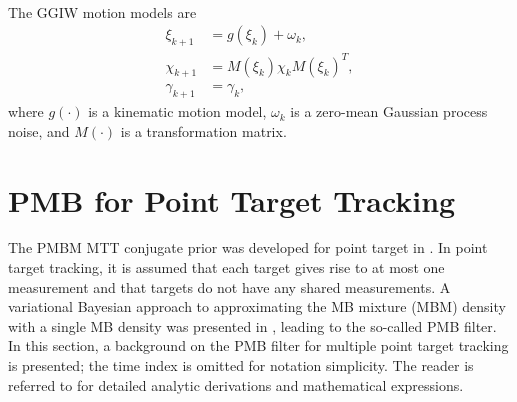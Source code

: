 ~\\
The GGIW motion models are
\begin{subequations}
\begin{align}
\xi_{k+1} &= g(\xi_k) + \omega_k,\\
\chi_{k+1} &= M(\xi_k)\chi_kM(\xi_k)^T,\\
\gamma_{k+1} &= \gamma_{k},
\end{align}
\end{subequations}
where $g(\cdot)$ is a kinematic motion model, $\omega_k$ is a zero-mean Gaussian process noise, and $M(\cdot)$ is a transformation matrix. 




\section{PMB for Point Target Tracking}
The PMBM MTT conjugate prior was developed for point target in \cite{pmbmpoint,pmbmpoint2}. In point target tracking, it is assumed that each target gives rise to at most one measurement and that targets do not have any shared measurements. A variational Bayesian approach to approximating the MB mixture (MBM) density with a single MB density was presented in \cite{variational}, leading to the so-called PMB filter. In this section, a background on the PMB filter for multiple point target tracking is presented; the time index is omitted for notation simplicity. The reader is referred to \cite{variational,pmbmpoint} for detailed analytic derivations and mathematical expressions.

